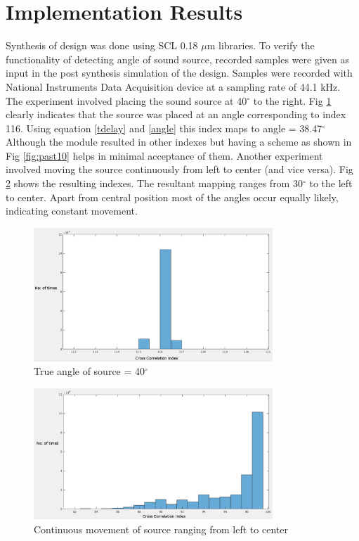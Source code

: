 \documentclass[conference]{IEEEtran}
\begin{document}
\section{Implementation Results}

Synthesis of design was done using SCL 0.18 $\mu$m libraries. To verify the functionality of detecting angle of sound source, recorded samples were given as input in the post synthesis simulation of the design. Samples were recorded with National Instruments Data Acquisition device at a sampling rate of 44.1 kHz. The experiment involved placing the sound source at 40$^\circ$ to the right. Fig \ref{fig:right} clearly indicates that the source was placed at an angle corresponding to index 116. Using equation \ref{tdelay} and \ref{angle} this index maps to angle = 38.47$^\circ$ Although the module resulted in other indexes but having a scheme as shown in Fig \ref{fig:past10} helps in minimal acceptance of them. Another experiment involved moving the source continuously from left to center (and vice versa). Fig \ref{fig:left} shows the resulting indexes. The resultant mapping ranges from 30$^\circ$ to the left to center. Apart from central position most of the angles occur equally likely, indicating constant movement. 

\begin{figure}
    \centering
    \includegraphics[width = 9cm]{right.png}
    \caption{True angle of source = 40$^\circ$}
    \label{fig:right}
\end{figure}

\begin{figure}
    \centering
    \includegraphics[width = 9cm]{left.png}
    \caption{Continuous movement of source ranging from left to center}
    \label{fig:left}
\end{figure}
\end{document}
